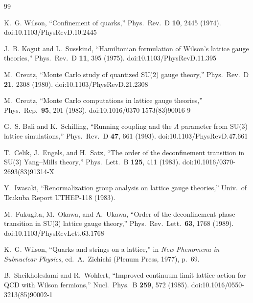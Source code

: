 \documentclass[12pt]{article}
\begin{document}
\begin{thebibliography}{99}

K.~G. Wilson, ``Confinement of quarks,'' Phys.\ Rev.\ D \textbf{10}, 2445 (1974).  doi:10.1103/PhysRevD.10.2445

J.~B. Kogut and L.~Susskind, ``Hamiltonian formulation of Wilson's lattice gauge theories,'' Phys.\ Rev.\ D \textbf{11}, 395 (1975).  doi:10.1103/PhysRevD.11.395

M.~Creutz, ``Monte Carlo study of quantized SU(2) gauge theory,'' Phys.\ Rev.\ D \textbf{21}, 2308 (1980).  doi:10.1103/PhysRevD.21.2308

M.~Creutz, ``Monte Carlo computations in lattice gauge theories,'' Phys.\ Rep.\ \textbf{95}, 201 (1983).  doi:10.1016/0370-1573(83)90016-9

G.~S. Bali and K.~Schilling, ``Running coupling and the $\Lambda$ parameter from SU(3) lattice simulations,'' Phys.\ Rev.\ D \textbf{47}, 661 (1993).  doi:10.1103/PhysRevD.47.661

T.~Celik, J.~Engels, and H.~Satz, ``The order of the deconfinement transition in SU(3) Yang--Mills theory,'' Phys.\ Lett.\ B \textbf{125}, 411 (1983).  doi:10.1016/0370-2693(83)91314-X  %

Y.~Iwasaki, ``Renormalization group analysis on lattice gauge theories,'' Univ.\ of Tsukuba Report UTHEP-118 (1983).  %

M.~Fukugita, M.~Okawa, and A.~Ukawa, ``Order of the deconfinement phase transition in SU(3) lattice gauge theory,'' Phys.\ Rev.\ Lett.\ \textbf{63}, 1768 (1989).  doi:10.1103/PhysRevLett.63.1768

K.~G. Wilson, ``Quarks and strings on a lattice,'' in \textit{New Phenomena in Subnuclear Physics}, ed.\ A.~Zichichi (Plenum Press, 1977), p.~69.

B.~Sheikholeslami and R.~Wohlert, ``Improved continuum limit lattice action for QCD with Wilson fermions,'' Nucl.\ Phys.\ B \textbf{259}, 572 (1985).  doi:10.1016/0550-3213(85)90002-1


\end{thebibliography}
\end{document}
